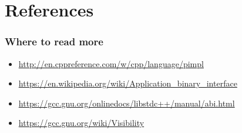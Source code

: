 \section*{References}

\begin{frame}[c]
  \frametitle{Where to read more}
  \begin{itemize}
    \item{\small{\url{http://en.cppreference.com/w/cpp/language/pimpl}}}
    \item{\small{\url{https://en.wikipedia.org/wiki/Application_binary_interface}}}
    \item{\small{\url{https://gcc.gnu.org/onlinedocs/libstdc++/manual/abi.html}}}
    \item{\small{\url{https://gcc.gnu.org/wiki/Visibility}}}
  \end{itemize}
\end{frame}
